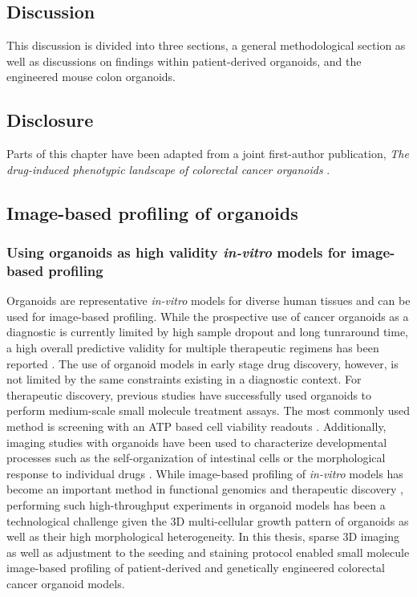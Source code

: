 \begin{flushleft}

\chapter{Discussion}
This discussion is divided into three sections, a general methodological section as well as discussions on findings within patient-derived organoids, and the engineered mouse colon organoids.

\section{Disclosure}
Parts of this chapter have been adapted from a joint first-author publication, \textit{The drug-induced phenotypic landscape of colorectal cancer organoids} \citep{betgeDruginducedPhenotypicLandscape2022}. 

\section{Image-based profiling of organoids}

\subsection{Using organoids as high validity \textit{in-vitro} models for image-based profiling}

Organoids are representative \textit{in-vitro} models for diverse human tissues and can be used for image-based profiling. While the prospective use of cancer organoids as a diagnostic is currently limited by high sample dropout and long tunraround time, a high overall predictive validity for multiple therapeutic regimens has been reported \citep{ooftProspectiveExperimentalTreatment2021}. The use of organoid models in early stage drug discovery, however, is not limited by the same constraints existing in a diagnostic context. For therapeutic discovery, previous studies have successfully used organoids to perform medium-scale small molecule treatment assays. The most commonly used method is screening with an ATP based cell viability readouts \citep{vandeweteringProspectiveDerivationLiving2015}. Additionally, imaging studies with organoids have been used to characterize developmental processes such as the self-organization of intestinal cells \citep{lukoninPhenotypicLandscapeIntestinal2020, boehnkeAssayEstablishmentValidation2016a} or the morphological response to individual drugs \citep{Badder2020-au, serraSelforganizationSymmetryBreaking2019}. While image-based profiling of \textit{in-vitro} models has become an important method in functional genomics and therapeutic discovery \citep{carpenterImagebasedChemicalScreening2007}, performing such high-throughput experiments in organoid models has been a technological challenge given the 3D multi-cellular growth pattern of organoids as well as their high morphological heterogeneity. In this thesis, sparse 3D imaging as well as adjustment to the seeding and staining protocol enabled small molecule image-based profiling of patient-derived and genetically engineered colorectal cancer organoid models. 
\bigbreak



\end{flushleft}
